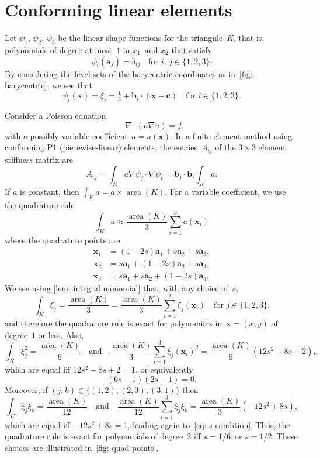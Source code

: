 \documentclass[a4paper,12pt]{article}
\newcommand{\bs}[1]{\boldsymbol{#1}}
\newcommand{\area}{\operatorname{area}}
\begin{document}
\section{Conforming linear elements}
Let $\psi_1$, $\psi_2$, $\psi_3$ be the linear shape functions for the
triangule~$K$, that is, polynomials of degree at most~$1$ in $x_1$~and $x_2$
that satisfy
\[
\psi_i(\bs{a}_j)=\delta_{ij}\quad\text{for $i$, $j\in\{1,2,3\}$.}
\]
By considering the level sets of the barycentric coordinates as
in~\cref{fig: barycentric}, we see that
\[
\psi_i(\bs{x})=\xi_i=\tfrac13+\bs{b}_i\cdot(\bs{x}-\bs{c})
    \quad\text{for $i\in\{1,2,3\}$.}
\]

Consider a Poisson equation,
\[
-\nabla\cdot(a\nabla u)=f,
\]
with a possibly variable coefficient~$a=a(\bs{x})$.  In a finite element
method using conforming P1 (piecewise-linear) elements, the entries~$A_{ij}$
of the $3\times3$ element stiffness matrix are
\[
A_{ij}=\int_K a\nabla\psi_j\cdot\nabla\psi_i=\bs{b}_j\cdot\bs{b}_i\int_K a.
\]
If $a$ is constant, then $\int_Ka=a\times\area(K)$.  For a variable
coefficient, we use the quadrature rule
\[
\int_Ka\approx\frac{\area(K)}{3}\sum_{i=1}^3 a(\bs{x}_i)
\]
where the quadrature points are
\begin{equation}\label{eq: quad points}
\begin{aligned}
\bs{x}_1&=(1-2s)\bs{a}_1+s\bs{a}_2+s\bs{a}_3,\\
\bs{x}_2&=s\bs{a}_1+(1-2s)\bs{a}_2+s\bs{a}_3,\\
\bs{x}_3&=s\bs{a}_1+s\bs{a}_2+(1-2s)\bs{a}_3,
\end{aligned}
\end{equation}
We see using \cref{lem: integral monomial} that, with any choice of~$s$,
\[
\int_K\xi_j=\frac{\area(K)}{3}=\frac{\area(K)}{3}\sum_{i=1}^3\xi_j(\bs{x}_i)
\quad\text{for $j\in\{1,2,3\}$,}
\]
and therefore the quadrature rule is exact for polynomials in~$\bs{x}=(x,y)$ of
degree~$1$ or less.  Also,
\[
\int_K\xi_j^2=\frac{\area(K)}{6}\quad\text{and}\quad
\frac{\area(K)}{3}\sum_{i=1}^3\xi_j(\bs{x}_i)^2=\frac{\area(K)}{6}(12s^2-8s+2),
\]
which are equal iff $12s^2-8s+2=1$, or equivalently
\begin{equation}\label{eq: s condition}
(6s-1)(2s-1)=0.
\end{equation}
Moreover, if $(j,k)\in\{(1,2),(2,3),(3,1)\}$ then
\[
\int_K\xi_j\xi_k=\frac{\area(K)}{12}\quad\text{and}\quad
\frac{\area(K)}{12}\sum_{i=1}^3\xi_j\xi_k=\frac{\area(K)}{3}(-12s^2+8s),
\]
which are equal iff $-12s^2+8s=1$, leading again to~\eqref{eq: s condition}.
Thus, the quadrature rule is exact for polynomials of degree~$2$ iff $s=1/6$~or
$s=1/2$.  These choices are illustrated in~\cref{fig: quad points}.
\end{document}
